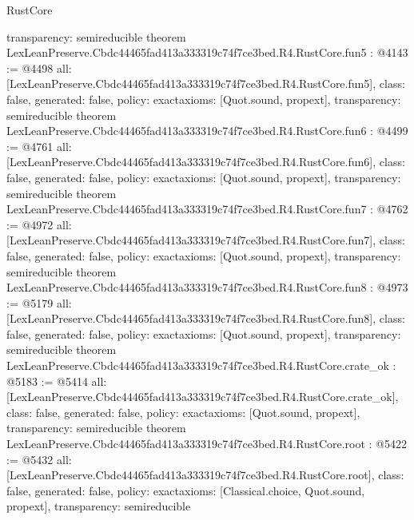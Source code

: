 \begin{lexlean}{RustCore}
\begin{coremodule}
{  transparency: semireducible
}
theorem LexLeanPreserve.Cbdc44465fad413a333319c74f7ce3bed.R4.RustCore.fun5 : @4143 := @4498 {
  all: [LexLeanPreserve.Cbdc44465fad413a333319c74f7ce3bed.R4.RustCore.fun5],
  class: false,
  generated: false,
  policy: exact{axioms: [Quot.sound, propext]},
  transparency: semireducible
}
theorem LexLeanPreserve.Cbdc44465fad413a333319c74f7ce3bed.R4.RustCore.fun6 : @4499 := @4761 {
  all: [LexLeanPreserve.Cbdc44465fad413a333319c74f7ce3bed.R4.RustCore.fun6],
  class: false,
  generated: false,
  policy: exact{axioms: [Quot.sound, propext]},
  transparency: semireducible
}
theorem LexLeanPreserve.Cbdc44465fad413a333319c74f7ce3bed.R4.RustCore.fun7 : @4762 := @4972 {
  all: [LexLeanPreserve.Cbdc44465fad413a333319c74f7ce3bed.R4.RustCore.fun7],
  class: false,
  generated: false,
  policy: exact{axioms: [Quot.sound, propext]},
  transparency: semireducible
}
theorem LexLeanPreserve.Cbdc44465fad413a333319c74f7ce3bed.R4.RustCore.fun8 : @4973 := @5179 {
  all: [LexLeanPreserve.Cbdc44465fad413a333319c74f7ce3bed.R4.RustCore.fun8],
  class: false,
  generated: false,
  policy: exact{axioms: [Quot.sound, propext]},
  transparency: semireducible
}
theorem LexLeanPreserve.Cbdc44465fad413a333319c74f7ce3bed.R4.RustCore.crate_ok : @5183 := @5414 {
  all: [LexLeanPreserve.Cbdc44465fad413a333319c74f7ce3bed.R4.RustCore.crate_ok],
  class: false,
  generated: false,
  policy: exact{axioms: [Quot.sound, propext]},
  transparency: semireducible
}
theorem LexLeanPreserve.Cbdc44465fad413a333319c74f7ce3bed.R4.RustCore.root : @5422 := @5432 {
  all: [LexLeanPreserve.Cbdc44465fad413a333319c74f7ce3bed.R4.RustCore.root],
  class: false,
  generated: false,
  policy: exact{axioms: [Classical.choice, Quot.sound, propext]},
  transparency: semireducible
}


\end{coremodule}
\end{lexlean}

